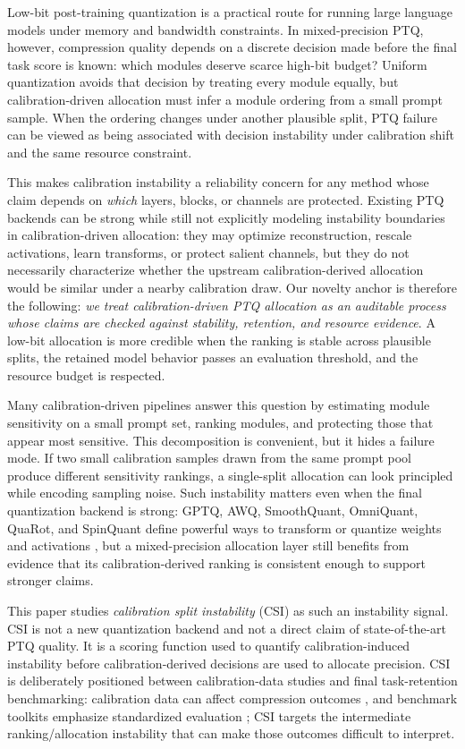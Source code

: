 \documentclass[letterpaper]{article}
\begin{document}
Low-bit post-training quantization is a practical route for running large
language models under memory and bandwidth constraints. In mixed-precision PTQ,
however, compression quality depends on a discrete decision made before the
final task score is known: which modules deserve scarce high-bit budget? Uniform
quantization avoids that decision by treating every module equally, but
calibration-driven allocation must infer a module ordering from a small prompt
sample. When the ordering changes under another plausible split, PTQ failure
can be viewed as being associated with decision instability under calibration
shift and the same resource constraint.

This makes calibration instability a reliability concern for any method whose
claim depends on \emph{which} layers, blocks, or channels are protected.
Existing PTQ backends can be strong while still not explicitly modeling
instability boundaries in calibration-driven allocation: they may optimize
reconstruction, rescale activations, learn transforms, or protect salient
channels, but they do not necessarily characterize whether the upstream
calibration-derived allocation would be similar under a nearby calibration draw.
Our novelty anchor is therefore the following: \emph{we treat
calibration-driven PTQ allocation as an auditable process whose claims are
checked against stability, retention, and resource evidence}. A low-bit
allocation is more credible when the ranking is stable across plausible splits,
the retained model behavior passes an evaluation threshold, and the resource
budget is respected.

Many calibration-driven pipelines answer this question by estimating module
sensitivity on a small prompt set, ranking modules, and protecting those that
appear most sensitive. This decomposition is convenient, but it hides a
failure mode. If two small calibration samples drawn from the same prompt pool
produce different sensitivity rankings, a single-split allocation can look
principled while encoding sampling noise. Such instability matters even when
the final quantization backend is strong: GPTQ, AWQ, SmoothQuant, OmniQuant,
QuaRot, and SpinQuant define powerful ways to transform or quantize weights and
activations \citep{frantar2023gptq,lin2024awq,xiao2023smoothquant,shao2024omniquant,ashkboos2024quarot,liu2024spinquant},
but a mixed-precision allocation layer still benefits from evidence that its
calibration-derived ranking is consistent enough to support stronger claims.

This paper studies \emph{calibration split instability} (CSI) as such an
instability signal. CSI is not a new quantization backend and not a direct claim
of state-of-the-art PTQ quality. It is a scoring function used to quantify
calibration-induced instability before calibration-derived decisions are used to
allocate precision. CSI is deliberately positioned
between calibration-data studies and final task-retention benchmarking:
calibration data can affect compression outcomes \citep{calibrationimpact2023},
and benchmark toolkits emphasize standardized evaluation \citep{llmc2024}; CSI
targets the intermediate ranking/allocation instability that can make those
outcomes difficult to interpret.
\end{document}
